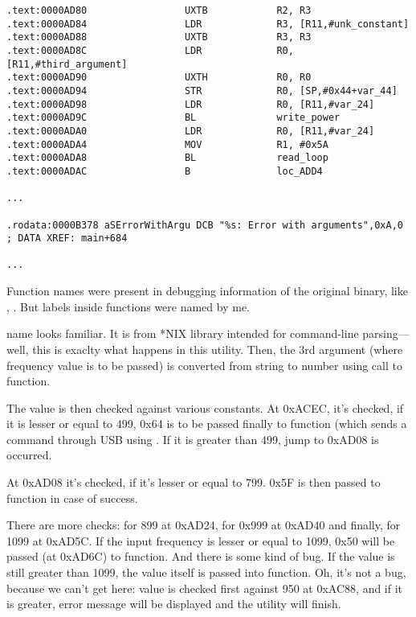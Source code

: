 \begin{lstlisting}
.text:0000AD80                 UXTB            R2, R3
.text:0000AD84                 LDR             R3, [R11,#unk_constant]
.text:0000AD88                 UXTB            R3, R3
.text:0000AD8C                 LDR             R0, [R11,#third_argument]
.text:0000AD90                 UXTH            R0, R0
.text:0000AD94                 STR             R0, [SP,#0x44+var_44]
.text:0000AD98                 LDR             R0, [R11,#var_24]
.text:0000AD9C                 BL              write_power
.text:0000ADA0                 LDR             R0, [R11,#var_24]
.text:0000ADA4                 MOV             R1, #0x5A
.text:0000ADA8                 BL              read_loop
.text:0000ADAC                 B               loc_ADD4

...

.rodata:0000B378 aSErrorWithArgu DCB "%s: Error with arguments",0xA,0 ; DATA XREF: main+684

...

\end{lstlisting}

Function names were present in debugging information of the original binary, like , .
But labels inside functions were named by me.

 name looks familiar. It is from  *NIX library intended for command-line parsing---well, this is exaclty what happens in this utility.
Then, the 3rd argument (where frequency value is to be passed) is converted from string to number using call to  function.

The value is then checked against various constants.
At 0xACEC, it's checked, if it is lesser or equal to 499, 0x64 is to be passed finally to  function (which sends a command through USB using .
If it is greater than 499, jump to 0xAD08 is occurred.

At 0xAD08 it's checked, if it's lesser or equal to 799. 0x5F is then passed to  function in case of success.

There are more checks: for 899 at 0xAD24, for 0x999 at 0xAD40 and finally, for 1099 at 0xAD5C.
If the input frequency is lesser or equal to 1099, 0x50 will be passed (at 0xAD6C) to  function.
And there is some kind of bug.
If the value is still greater than 1099, the value itself is passed into  function.
Oh, it's not a bug, because we can't get here: value is checked first against 950 at 0xAC88, and if it is greater, error message will be displayed and the utility will finish.

